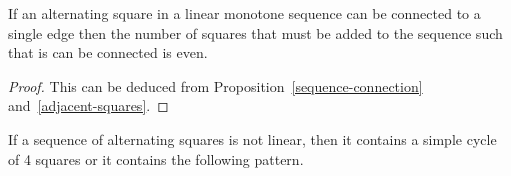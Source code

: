 \begin{proposition}
  \label{parity-sequence-squares}
  If an alternating square in a linear monotone sequence can be connected to a single edge then the number of squares that must be added to the sequence such that is can be connected is even.
\end{proposition}

\begin{proof}
  This can be deduced from Proposition~\ref{sequence-connection} and~\ref{adjacent-squares}.
\end{proof}

\begin{proposition}
  \label{rotation-pattern}
  If a sequence of alternating squares is not linear, then it contains a simple cycle of 4 squares or it contains the following pattern.

  \begin{figure}[H]
    \begin{center}
      \caption{}
    \end{center}
  \end{figure}
\end{proposition}

